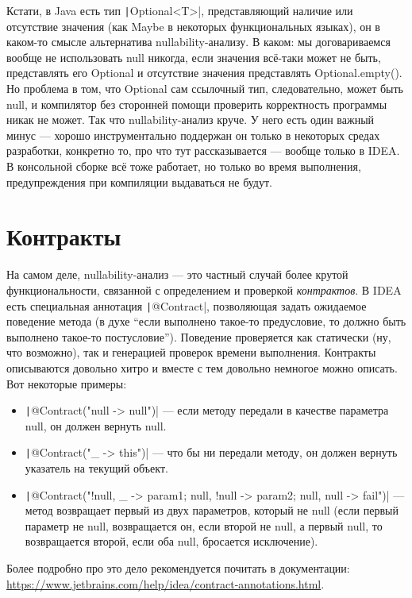\documentclass[a5paper]{article}
\begin{document}
Кстати, в Java есть тип \texttt|Optional<T>|, представляющий наличие или отсутствие значения (как Maybe в некоторых функциональных языках), он в каком-то смысле альтернатива nullability-анализу. В каком: мы договариваемся вообще не использовать null никогда, если значения всё-таки может не быть, представлять его Optional и отсутствие значения представлять Optional.empty(). Но проблема в том, что Optional сам ссылочный тип, следовательно, может быть null, и компилятор без сторонней помощи проверить корректность программы никак не может. Так что nullability-анализ круче. У него есть один важный минус --- хорошо инструментально поддержан он только в некоторых средах разработки, конкретно то, про что тут рассказывается --- вообще только в IDEA. В консольной сборке всё тоже работает, но только во время выполнения, предупреждения при компиляции выдаваться не будут.

\section{Контракты}

На самом деле, nullability-анализ --- это частный случай более крутой функциональности, связанной с определением и проверкой \textit{контрактов}. В IDEA есть специальная аннотация \texttt|@Contract|, позволяющая задать ожидаемое поведение метода (в духе ``если выполнено такое-то предусловие, то должно быть выполнено такое-то постусловие''). Поведение проверяется как статически (ну, что возможно), так и генерацией проверок времени выполнения. Контракты описываются довольно хитро и вместе с тем довольно немногое можно описать. Вот некоторые примеры:

\begin{itemize}
	\item \texttt|@Contract("null -> null")| --- если методу передали в качестве параметра null, он должен вернуть null.
	\item \texttt|@Contract("_ -> this")| --- что бы ни передали методу, он должен вернуть указатель на текущий объект.
	\item \texttt|@Contract("!null, _ -> param1; null, !null -> param2; null, null -> fail")| --- метод возвращает первый из двух параметров, который не null (если первый параметр не null, возвращается он, если второй не null, а первый null, то возвращается второй, если оба null, бросается исключение).
\end{itemize}

Более подробно про это дело рекомендуется почитать в документации: \url{https://www.jetbrains.com/help/idea/contract-annotations.html}.
\end{document}
